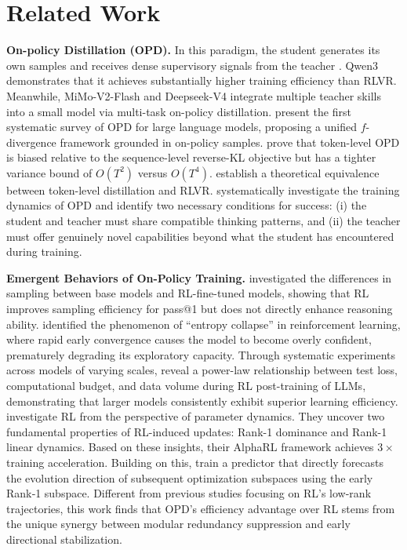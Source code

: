 \documentclass{article}
\begin{document}
\section{Related Work}
\label{Related Work}

\textbf{On-policy Distillation (OPD).}
In this paradigm, the student generates its own samples and receives dense supervisory signals from the teacher \citep{agarwal2024policy}. Qwen3 \citep{yang2025qwen3technicalreport} demonstrates that it achieves substantially higher training efficiency than RLVR. Meanwhile, MiMo-V2-Flash \citep{xiao2026mimo} and Deepseek-V4 \citep{deepseek2026v4} integrate multiple teacher skills into a small model via multi-task on-policy distillation. \cite{song2026survey} present the first systematic survey of OPD for large language models, proposing a unified $f$-divergence framework grounded in on-policy samples. \cite{fu2026revisiting} prove that token-level OPD is biased relative to the sequence-level reverse-KL objective but has a tighter variance bound of $O(T^2)$ versus $O(T^4)$. \cite{yang2026learning} establish a theoretical equivalence between token-level distillation and RLVR. \cite{li2026rethinking} systematically investigate the training dynamics of OPD and identify two necessary conditions for success: (i) the student and teacher must share compatible thinking patterns, and (ii) the teacher must offer genuinely novel capabilities beyond what the student has encountered during training.

\textbf{Emergent Behaviors of On-Policy Training.}
\cite{yue2025doesreinforcementlearningreally} investigated the differences in sampling between base models and RL-fine-tuned models, showing that RL improves sampling efficiency for pass@1 but does not directly enhance reasoning ability.  
\cite{cui2025entropymechanismreinforcementlearning} identified the phenomenon of ``entropy collapse'' in reinforcement learning, where rapid early convergence causes the model to become overly confident, prematurely degrading its exploratory capacity. Through systematic experiments across models of varying scales, \cite{tan2026scalingbehaviorsllmreinforcement} reveal a power-law relationship between test loss, computational budget, and data volume during RL post-training of LLMs, demonstrating that larger models consistently exhibit superior learning efficiency. \cite{cai2025predictability} investigate RL from the perspective of parameter dynamics. They uncover two fundamental properties of RL-induced updates: Rank-1 dominance and Rank-1 linear dynamics. Based on these insights, their AlphaRL framework achieves $3 \times$ training acceleration. Building on this, \cite{chen2026lowrankoptimizationtrajectoriesmodeling} train a predictor that directly forecasts the evolution direction of subsequent optimization subspaces using the early Rank‑1 subspace. Different from previous studies focusing on RL's low-rank trajectories, this work finds that OPD's efficiency advantage over RL stems from the unique synergy between modular redundancy suppression and early directional stabilization.
\end{document}
